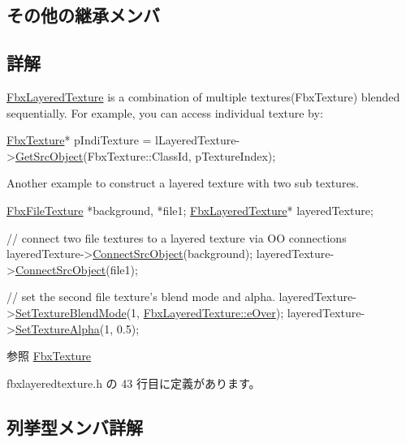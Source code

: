 \subsection*{その他の継承メンバ}


\subsection{詳解}
\hyperlink{class_fbx_layered_texture}{Fbx\+Layered\+Texture} is a combination of multiple textures(\+Fbx\+Texture) blended sequentially. For example, you can access individual texture by\+: 
\begin{DoxyCode}
\hyperlink{class_fbx_texture}{FbxTexture}* pIndiTexture = lLayeredTexture->\hyperlink{class_fbx_object_a655ed30675d9bf1686ec075f5e7c7a84}{GetSrcObject}(FbxTexture::ClassId, 
      pTextureIndex);
\end{DoxyCode}
 Another example to construct a layered texture with two sub textures. 
\begin{DoxyCode}
\hyperlink{class_fbx_file_texture}{FbxFileTexture} *background, *file1;
\hyperlink{class_fbx_layered_texture}{FbxLayeredTexture}* layeredTexture;

\textcolor{comment}{// connect two file textures to a layered texture via OO connections}
layeredTexture->\hyperlink{class_fbx_object_a1c75d466c5166486787bfa06b4fd221f}{ConnectSrcObject}(background);
layeredTexture->\hyperlink{class_fbx_object_a1c75d466c5166486787bfa06b4fd221f}{ConnectSrcObject}(file1);

\textcolor{comment}{// set the second file texture's blend mode and alpha.}
layeredTexture->\hyperlink{class_fbx_layered_texture_ae16a157ad7ff41d377a2cff885a00c80}{SetTextureBlendMode}(1, 
      \hyperlink{class_fbx_layered_texture_af291d42b0329513909d2ddf48f56f5baab235ee3fa24dcb41e4d8e1ae837bae70}{FbxLayeredTexture::eOver});
layeredTexture->\hyperlink{class_fbx_layered_texture_a87145db35c3a207f5e54c9a9dcd83f1f}{SetTextureAlpha}(1, 0.5);
\end{DoxyCode}


\begin{DoxySeeAlso}{参照}
\hyperlink{class_fbx_texture}{Fbx\+Texture} 
\end{DoxySeeAlso}


 fbxlayeredtexture.\+h の 43 行目に定義があります。



\subsection{列挙型メンバ詳解}
\mbox{\label{class_fbx_layered_texture_af291d42b0329513909d2ddf48f56f5ba}} 
